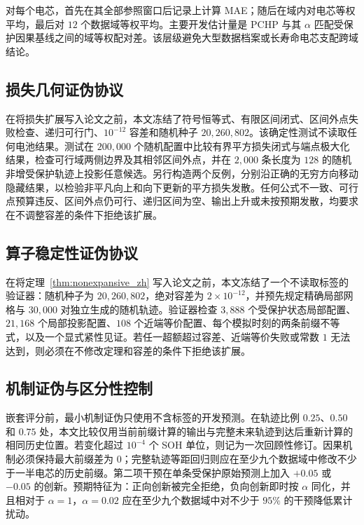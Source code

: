 \documentclass[UTF8,11pt]{ctexart}
\begin{document}
对每个电芯，首先在其全部参照窗口后记录上计算 MAE；随后在域内对电芯等权平均，最后对 $12$ 个数据域等权平均。主要开发估计量是 PCHP 与其 $\alpha$ 匹配受保护因果基线之间的域等权配对差。该层级避免大型数据档案或长寿命电芯支配跨域结论。

\subsection{损失几何证伪协议}

在将损失扩展写入论文之前，本文冻结了符号恒等式、有限区间闭式、区间外点失败检查、递归可行门、$10^{-12}$ 容差和随机种子 $20{,}260{,}802$。该确定性测试不读取任何电池结果。测试在 $200{,}000$ 个随机配置中比较有界平方损失闭式与端点极大化结果，检查可行域两侧边界及其相邻区间外点，并在 $2{,}000$ 条长度为 $128$ 的随机非增受保护轨迹上投影任意候选。另行构造两个反例，分别沿正确的无穷方向移动隐藏结果，以检验非平凡向上和向下更新的平方损失发散。任何公式不一致、可行点预算违反、区间外点仍可行、递归区间为空、输出上升或未按预期发散，均要求在不调整容差的条件下拒绝该扩展。

\subsection{算子稳定性证伪协议}

在将定理~\ref{thm:nonexpansive_zh} 写入论文之前，本文冻结了一个不读取标签的验证器：随机种子为 $20{,}260{,}802$，绝对容差为 $2\times10^{-12}$，并预先规定精确局部网格与 $30{,}000$ 对独立生成的随机轨迹。验证器检查 $3{,}888$ 个受保护状态局部配置、$21{,}168$ 个局部投影配置、$108$ 个近端等价配置、每个模拟时刻的两条前缀不等式，以及一个显式紧性见证。若任一超额超过容差、近端等价失败或常数 $1$ 无法达到，则必须在不修改定理和容差的条件下拒绝该扩展。

\subsection{机制证伪与区分性控制}

嵌套评分前，最小机制证伪只使用不含标签的开发预测。在轨迹比例 $0.25$、$0.50$ 和 $0.75$ 处，本文比较仅用当前前缀计算的输出与完整未来轨迹到达后重新计算的相同历史位置。若变化超过 $10^{-4}$ 个 SOH 单位，则记为一次回顾性修订。因果机制必须保持最大前缀差为 $0$；完整轨迹等距回归则应在至少九个数据域中修改不少于一半电芯的历史前缀。第二项干预在单条受保护原始预测上加入 $+0.05$ 或 $-0.05$ 的创新。预期特征为：正向创新被完全拒绝，负向创新即时按 $\alpha$ 同化，并且相对于 $\alpha=1$，$\alpha=0.02$ 应在至少九个数据域中对不少于 $95\%$ 的干预降低累计扰动。
\end{document}
